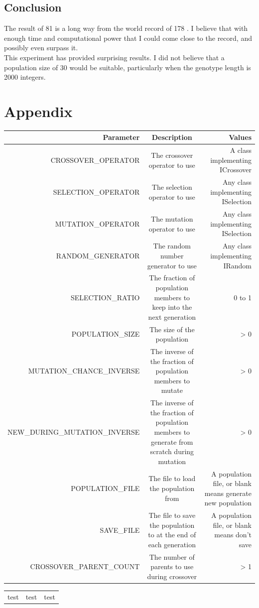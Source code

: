 \documentclass[]{report}
\begin{document}
\section{Conclusion}
The result of 81 is a long way from the world record of 178 \citep{morpionRecord}. I believe that with enough time and computational power that I could come close to the record, and possibly even surpass it.\\

This experiment has provided surprising results. I did not believe that a population size of 30 would be suitable, particularly when the genotype length is 2000 integers. 



\chapter{Appendix}
\begin{landscape}
\begin{tabular}{r | c | r}
Parameter & Description & Values \\
\hline
CROSSOVER\_OPERATOR & The crossover operator to use & A class implementing ICrossover \\
SELECTION\_OPERATOR & The selection operator to use & Any class implementing ISelection \\
MUTATION\_OPERATOR & The mutation operator to use & Any class implementing ISelection \\
RANDOM\_GENERATOR & The random number generator to use & Any class implementing IRandom \\
SELECTION\_RATIO & The fraction of population members to keep into the next generation & 0 to 1 \\
POPULATION\_SIZE & The size of the population & > 0 \\
MUTATION\_CHANCE\_INVERSE & The inverse of the fraction of population members to mutate & > 0 \\
NEW\_DURING\_MUTATION\_INVERSE & The inverse of the fraction of population members to generate from scratch during mutation & > 0 \\
POPULATION\_FILE & The file to load the population from & A population file, or blank means generate new population \\
SAVE\_FILE & The file to save the population to at the end of each generation & A population file, or blank means don't save \\
CROSSOVER\_PARENT\_COUNT & The number of parents to use during crossover & > 1 \\ 
\end{tabular}      
\end{landscape}  


\begin{longtable}{l | l | l}
\hline
test & test & test
\end{longtable}
\end{document}
